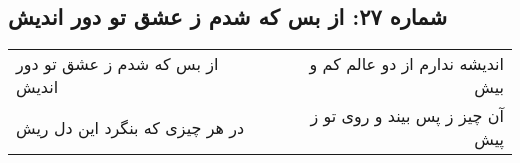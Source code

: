 \begin{center}
\section*{شماره ۲۷: از بس که شدم ز عشق تو دور اندیش}
\label{sec:027}
\begin{longtable}{l p{0.5cm} r}
از بس که شدم ز عشق تو دور اندیش
&&
اندیشه ندارم از دو عالم کم و بیش
\\
در هر چیزی که بنگرد این دل ریش
&&
آن چیز ز پس بیند و روی تو ز پیش
\\
\end{longtable}
\end{center}
